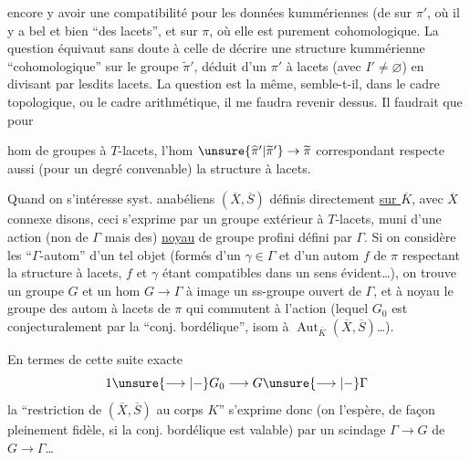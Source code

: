  
encore y avoir une compatibilité
pour les données kummériennes (de
 sur $\pi'$, où il y a bel et
bien ``des lacets'', et sur $\pi$, où elle est
purement cohomologique. \unsure{\S} La question
équivaut sans doute à celle de décrire
une structure kummérienne ``cohomologique''
sur le groupe $\widetilde\pi'$, déduit d'un $\pi'$ à
lacets (avec $I'\ne\varnothing$) en divisant par
lesdits lacets. La question est la
même, semble-t-il, dans le cadre topologique,
ou le cadre arithmétique, il me faudra
revenir dessus. Il faudrait que pour 


hom  de groupes à $T$-lacets, l'hom
$\unsure{\widehat\pi'|\widetilde\pi'}\to\widetilde\pi$ correspondant respecte aussi (pour
un degré convenable) la structure à lacets.

Quand on s'intéresse  syst. anabéliens
$(\overline X,\overline S)$ définis directement \uline{sur $\overline K$}, avec $\overline X$
connexe disons, ceci s'exprime
par un groupe extérieur à $T$-lacets,
muni d'une action (non de $\Gamma$ mais
des) \uline{noyau} de groupe profini défini par $\Gamma$.
Si on considère les  ``$\Gamma$-autom'' d'un
tel objet (formés d'un $\gamma\in\Gamma$ et
d'un autom  $f$ de $\pi$ respectant la
structure à lacets, $f$ et $\gamma$ étant compatibles
dans un sens évident\dots), on trouve
un groupe  $G$ et un hom  $G\to\Gamma$
à image un ss-groupe ouvert de $\Gamma$, et
à noyau  le groupe des autom  à
lacets de $\pi$ qui commutent à l'action 
  (lequel $G_0$ est conjecturalement par la
``conj. bordélique'', isom à  $\operatorname{Aut}_{\overline K}(\overline X,\overline S)$\dots).


En termes de cette suite exacte
\[
1\unsure{\longrightarrow|-}G_0\longrightarrow G\unsure{\longrightarrow|-}\Gamma
\]
la ``restriction de $(\overline X,\overline S)$ au corps $K$'' s'exprime
donc (on l'espère, de façon pleinement fidèle,
si la conj. bordélique est valable) par
un scindage $\Gamma\to G$ de $G\to\Gamma$\dots

